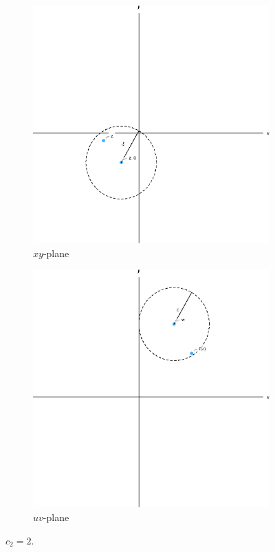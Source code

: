 \documentclass[12pt]{book}
\begin{document}
\begin{figure}[H]
    \centering
    \begin{subfigure}{0.45\textwidth}
        \centering
        \includegraphics[width = \textwidth]{./figs/chapter_1/limits_def_2.eps}
        \caption{$xy$-plane}
    \end{subfigure}
    \qquad
    \begin{subfigure}{0.45\textwidth}
        \centering
        \includegraphics[width = \textwidth]{./figs/chapter_1/limits_def_1.eps}
        \caption{$uv$-plane}
    \end{subfigure}
    \caption{$c_2 = 2.$}
\end{figure}
\end{document}
